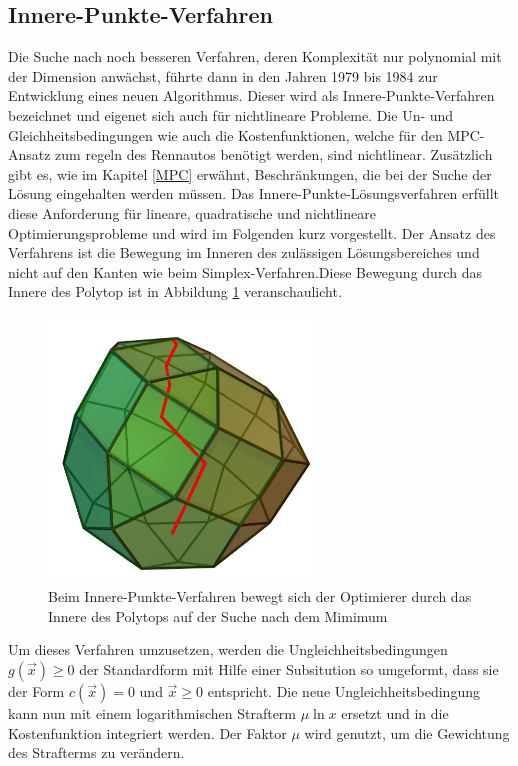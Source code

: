 \documentclass{like}
\begin{document}
\subsection{Innere-Punkte-Verfahren} 
\label{ipm} 
Die Suche nach noch besseren Verfahren, deren Komplexität nur polynomial mit der Dimension anwächst, führte dann in den Jahren 1979 bis 1984 zur Entwicklung eines neuen Algorithmus. Dieser wird als Innere-Punkte-Verfahren bezeichnet und eigenet sich auch für nichtlineare Probleme. Die Un- und Gleichheitsbedingungen wie auch die Kostenfunktionen, welche für den \ac{MPC}-Ansatz zum regeln des Rennautos benötigt werden, sind nichtlinear. Zusätzlich gibt es, wie im Kapitel \ref{MPC} erwähnt, Beschränkungen, die bei der Suche der Lösung eingehalten werden müssen. Das Innere-Punkte-Lösungsverfahren erfüllt diese Anforderung für lineare, quadratische und nichtlineare Optimierungsprobleme und wird im Folgenden kurz vorgestellt. Der Ansatz des Verfahrens ist die Bewegung im Inneren des zulässigen Lösungsbereiches und nicht auf den Kanten wie beim Simplex-Verfahren.Diese Bewegung durch das Innere des Polytop ist in Abbildung \ref{fig:iterPointMethod} veranschaulicht.  
\begin{figure}[ht!]
	\centering
	\includegraphics[width=200pt]{Abbildungen/iterPointMethod.png}
	\caption{Beim Innere-Punkte-Verfahren bewegt sich der Optimierer durch das Innere des Polytops auf der Suche nach dem Mimimum}
	\label{fig:iterPointMethod}
\end{figure}

Um dieses Verfahren umzusetzen, werden die Ungleichheitsbedingungen $g(\vec{x}) \geq 0$ der Standardform mit Hilfe einer Subsitution so umgeformt, dass sie der Form $c(\vec{x}) = 0$ und $\vec{x} \geq  0$ entspricht. Die neue Ungleichheitsbedingung kann nun mit einem logarithmischen Strafterm $ \mu \ln x $  ersetzt und in die Kostenfunktion integriert werden. 
Der Faktor $\mu$ wird genutzt, um die Gewichtung des Strafterms zu verändern.
\end{document}
